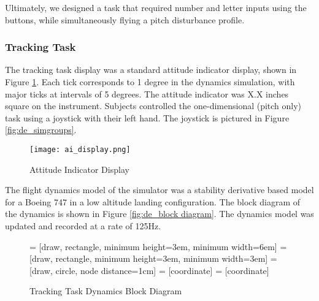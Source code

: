 Ultimately, we designed a task that required number and letter inputs using the buttons, while simultaneously flying a pitch disturbance profile.

\subsubsection{Tracking Task}

The tracking task display was a standard attitude indicator display, shown in Figure \ref{fig:de_ai_display}.
Each tick corresponds to 1 degree in the dynamics simulation, with major ticks at intervals of 5 degrees.
The attitude indicator was X.X inches square on the instrument. 
Subjects controlled the one-dimensional (pitch only) task using a joystick with their left hand.
The joystick is pictured in Figure \ref{fig:de_simgroups}.

\begin{figure}
    \texttt{[image: ai\_display.png]}
    \caption{Attitude Indicator Display}
    \label{fig:de_ai_display}
\end{figure}

The flight dynamics model of the simulator was a stability derivative based model for a Boeing 747 in a low altitude landing configuration.
The block diagram of the dynamics is shown in Figure \ref{fig:de_block diagram}.
The dynamics model was updated and recorded at a rate of 125Hz.

\begin{figure}
     = [draw, rectangle, minimum height=3em, minimum width=6em]
     = [draw, rectangle, minimum height=3em, minimum width=3em]
     = [draw, circle, node distance=1cm]
     = [coordinate]
     = [coordinate]
    \caption{Tracking Task Dynamics Block Diagram}
    \label{fig:de_block_diagram}
\end{figure}

